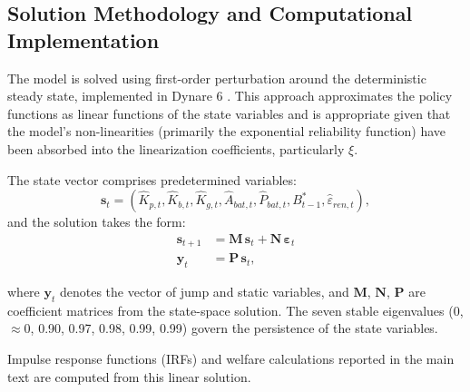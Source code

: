 	\subsection{Solution Methodology and Computational Implementation} \label{app:solution}
	
	The model is solved using first-order perturbation around the deterministic steady state, implemented in Dynare 6 \citep{Adjemianetal2024}. This approach approximates the policy functions as linear functions of the state variables and is appropriate given that the model's non-linearities (primarily the exponential reliability function) have been absorbed into the linearization coefficients, particularly $\xi$.
	
	The state vector comprises predetermined variables:
	\begin{equation}
		\mathbf{s}_t = (\hat{K}_{p,t}, \hat{K}_{b,t}, \hat{K}_{g,t}, \hat{A}_{bat,t}, \hat{P}_{bat,t}, B^*_{t-1}, \hat{\varepsilon}_{ren,t}),
	\end{equation}
	and the solution takes the form:
	\begin{align}
		\mathbf{s}_{t+1} &= \mathbf{M} \, \mathbf{s}_t + \mathbf{N} \, \boldsymbol{\varepsilon}_t \\
		\mathbf{y}_t &= \mathbf{P} \, \mathbf{s}_t,
	\end{align}
	
	where $\mathbf{y}_t$ denotes the vector of jump and static variables, and $\mathbf{M}$, $\mathbf{N}$, $\mathbf{P}$ are coefficient matrices from the state-space solution. The seven stable eigenvalues (0, $\approx$0, 0.90, 0.97, 0.98, 0.99, 0.99) govern the persistence of the state variables.
	
	Impulse response functions (IRFs) and welfare calculations reported in the main text are computed from this linear solution.

